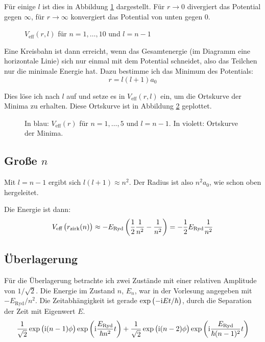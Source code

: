 Für einige $l$ ist dies in Abbildung \ref{fig:1} dargestellt. Für $r \to 0$
divergiert das Potential gegen $\infty$, für $r \to \infty$ konvergiert das
Potential von unten gegen 0.

\begin{figure}
	\centering
	\caption{$V_\text{eff}(r, l)$ für $n = 1, \ldots, 10$ und $l = n - 1$}
	\label{fig:1}
\end{figure}

Eine Kreisbahn ist dann erreicht, wenn das Gesamtenergie (im Diagramm eine
horizontale Linie) sich nur einmal mit dem Potential schneidet, also das
Teilchen nur die minimale Energie hat. Dazu bestimme ich das Minimum des
Potentials:
\[
	r = l(l+1) a_0
\]

Dies löse ich nach $l$ auf und setze es in $V_\text{eff}(r, l)$ ein, um die
Ortskurve der Minima zu erhalten. Diese Ortskurve ist in Abbildung \ref{fig:2}
geplottet.

\begin{figure}
	\centering
	\caption{%
		In blau: $V_\text{eff}(r)$ für $n = 1, \ldots, 5$ und $l = n - 1$. In
		violett: Ortskurve der Minima.
	}
	\label{fig:2}
\end{figure}

\subsection{Große $n$}

Mit $l = n - 1$ ergibt sich $l(l+1) \approx n^2$. Der Radius ist also $n^2 a_0$, wie schon oben hergeleitet.

Die Energie ist dann:
\[
	V_\text{eff}\del{r_\text{zirk}(n)}
	\approx - E_\text{Ryd} \del{\half \frac1{n^2} - \frac1{n^2}}
	= - \half E_\text{Ryd} \frac1{n^2}
\]

\subsection{Überlagerung}

Für die Überlagerung betrachte ich zwei Zustände mit einer relativen Amplitude
von $1/\sqrt2$. Die Energie im Zustand $n$, $E_n$, war in der Vorlesung
angegeben mit $-E_\text{Ryd}/n^2$. Die Zeitabhängigkeit ist gerade
$\exp\del{-\ii Et/\hbar}$, durch die Separation der Zeit mit Eigenwert $E$.
\[
	\frac1{\sqrt2} \exp\del{\ii (n-1) \phi} \exp\del{\ii \frac{E_\text{Ryd}}{\hbar n^2} t}
	+
	\frac1{\sqrt2} \exp\del{\ii (n-2) \phi} \exp\del{\ii \frac{E_\text{Ryd}}{\hbar (n-1)^2} t}
\]

